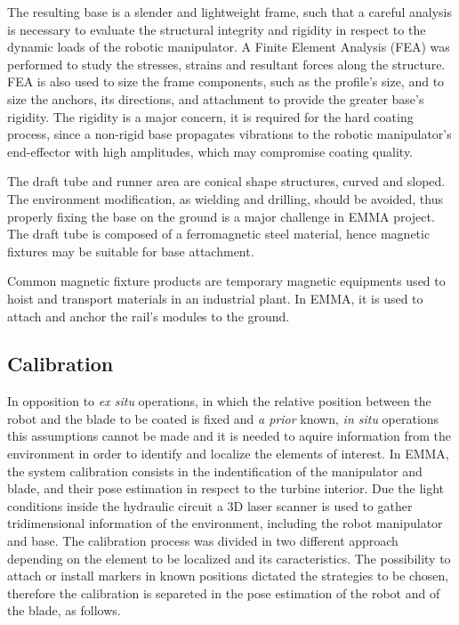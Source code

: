 The resulting base is a slender and lightweight frame, such that a careful
analysis is necessary to evaluate the structural integrity and rigidity in
respect to the dynamic loads of the robotic manipulator. A Finite Element
Analysis (FEA) was performed to study the stresses, strains and resultant forces
along the structure. FEA is also used to size the frame components, such as
the profile's size, and to size the anchors, its directions, and attachment to
provide the greater base's rigidity. The rigidity is a major concern, it is
required for the hard coating process, since a non-rigid base propagates
vibrations to the robotic manipulator's end-effector with high amplitudes, which
may compromise coating quality.

The draft tube and runner area are conical shape structures, curved and
sloped. The environment modification, as wielding and drilling, should be
avoided, thus properly fixing the base on the ground is a major challenge in
EMMA project. The draft tube is composed of a ferromagnetic steel material,
hence magnetic fixtures may be suitable for base attachment. 

Common magnetic fixture products are temporary magnetic equipments used to hoist
and transport materials in an industrial plant. In EMMA, it is used to attach
and anchor the rail's modules to the ground.


\subsection{Calibration}

In opposition to \textit{ex situ} operations, in which the relative position
between the robot and the blade to be coated is fixed and \textit{a prior}
known, \textit{in situ} operations this assumptions cannot be made and it
is needed to aquire information from the environment in order to identify
and localize the elements of interest. In EMMA, the system calibration consists
in the indentification of the manipulator and blade, and their
pose estimation in respect to the turbine interior. Due the light conditions
inside the hydraulic circuit  a 3D laser scanner is used to gather
tridimensional information of the environment, including the robot manipulator
and base. The calibration process was divided in two different approach
depending on the element to be localized and its caracteristics. The possibility
to attach or install markers in known positions dictated the strategies to be
chosen, therefore the calibration is separeted in the pose estimation of the
robot and of the blade, as follows.
 

